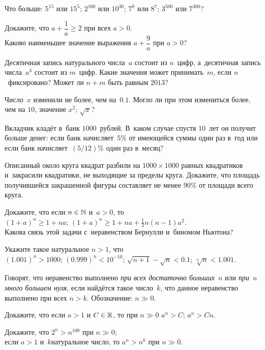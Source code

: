\documentclass[a4paper,12pt]{article}
\begin{document}


Что больше:
$5^{15}$ или $15^5$;
$2^{100}$ или $10^{30}$;
$7^8$ или $8^7$;
$3^{500}$ или $7^{300}$?

Докажите, что $a+\dfrac1a\geqslant2$ при всех $a>0$.\\
Каково наименьшее значение выражения $a+\dfrac9a$ при $a>0$?

Десятичная запись натурального числа~$a$ состоит из $n$~цифр, а~десятичная запись числа~$a^3$ состоит из $m$~цифр.
Какие значения может принимать~$m$, если $n$~фиксировано?
Может ли $n+m$ быть равным $2013$?

Число~$x$ изменили не более, чем на~$0.1$. Могло ли при этом измениться более, чем на $10$, значение
$x^2$;
$\sqrt x$?

Вкладчик кладёт в~банк $1000$~рублей. В~каком случае спустя 10~лет он получит больше денег: если банк начисляет~$5\%$ от имеющейся суммы один раз в~год или если банк начисляет~$(5/12)\%$ один раз в~месяц?

Описанный около круга квадрат разбили на $1000\times1000$ равных квадратиков и~закрасили квадратики, не выходящие за пределы круга. Докажите, что площадь получившейся закрашенной фигуры составляет не менее $90\%$ от площади всего круга.

Докажите, что если $n\in\mathbb{N}$ и~$a>0$, то\\
$(1+a)^n\geqslant 1+na$;
$(1+a)^n\geqslant 1+na+\frac12n(n-1)a^2$.\\
Какова связь этой задачи с~неравенством Бернулли и~биномом Ньютона?

Укажите такое натуральное $n>1$, что\\
$(1.001)^n>1000$;
$(0.999)^n<10^{-10}$;
$\sqrt{n+1} - \sqrt n < 0.1$;
$\sqrt[n]{n} < 1.001$.

Говорят, что неравенство выполнено \emph{при всех достаточно
больших~$n$} или \emph{при~$n$ много большем нуля}, если найдётся
такое число~$k$, что данное неравенство выполнено при всех $n>k$.
Обозначение: $n\gg 0$.

Докажите, что если $a>1$ и $C\in\mathbb{R}$, то при $n\gg0$
$a^n>C$;
$a^n>Cn$.

Докажите, что
$2^n>n^{100}$ при $n\gg0$;\\
если $a>1$ и~$k$\т натуральное число, то $a^n>n^k$ при $n\gg0$.
\end{document}
